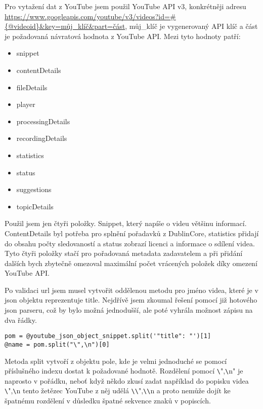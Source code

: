 \par Pro vytažení dat z YouTube jsem použil YouTube API v3, konkrétněji adresu \url{https://www.googleapis.com/youtube/v3/videos?id=#{@videoid}&key=můj\_klíč&part=část}, můj\_klíč je vygenerovaný API klíč a část je požadovaná návratová hodnota z YouTube API. Mezi tyto hodnoty patří:
\begin{itemize} 
\item{snippet}
\item{contentDetails}
\item{fileDetails}
\item{player}
\item{processingDetails}
\item{recordingDetails}
\item{statistics}
\item{status}
\item{suggestions}
\item{topicDetails}
\end{itemize}
\par Použil jsem jen čtyři položky. Snippet, který napíše o videu většinu informací. ContentDetails byl potřeba pro splnění pořadavků z DublinCore, statistics přidají do obsahu počty sledovaností a status zobrazí licenci a informace o sdílení videa. Tyto čtyři položky stačí pro pořadovaná metadata zadavatelem a při přidání dalších bych zbytečně omezoval maximální počet vrácených položek díky omezení YouTube API.

\par Po validaci url jsem musel vytvořit oddělenou metodu pro jméno videa, které je v json objektu reprezentuje title. Nejdřívě jsem zkoumal řešení pomocí již hotového json parseru, což by bylo možná jednodušší, ale poté vyhrála možnost zápisu na dva řádky.
\begin{verbatim}
pom = @youtube_json_object_snippet.split('"title": "')[1]
@name = pom.split("\",\n")[0]
\end{verbatim}
\par Metoda split vytvoří z objektu pole, kde je velmi jednoduché se pomocí příslušného indexu dostat k požadované hodnotě. Rozdělení pomocí \verb|\|",\verb|\|n" je naprosto v pořádku, neboť když někdo zkusí zadat například do popisku videa \verb|\|",\verb|\|n tento žetězec YouTube z něj udělá \verb|\|\verb|\|",\verb|\|\verb|\|n a proto nemůže dojít ke špatnému rozdělení v důsledku špatné sekvence znaků v popiscích. 
